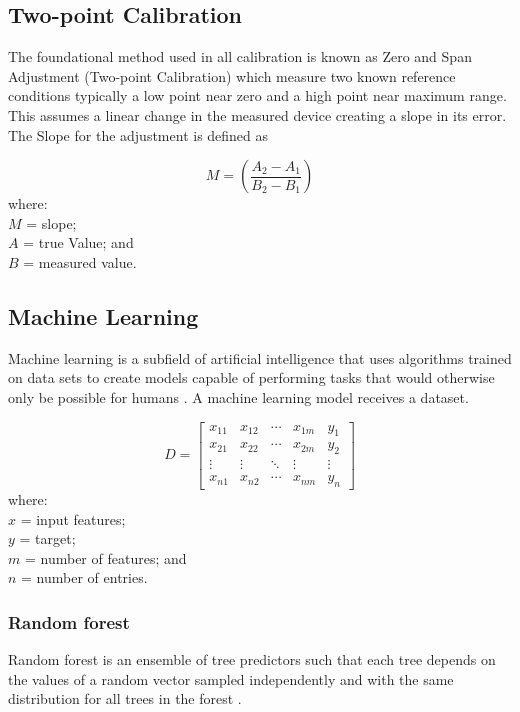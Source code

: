 \subsection{Two-point Calibration}
The foundational method used in all calibration is known as Zero and Span Adjustment (Two-point Calibration) which measure two known reference conditions typically a low point near zero and a high point near maximum range. This assumes a linear change in the measured device creating a slope in its error. The Slope for the adjustment is defined as \cite{Fraden_2016}

\begin{equation}
	M = \left( \frac{A_2 - A_1}{B_2 - B_1} \right)
	\label{eq:slope}
\end{equation}
\noindent where: \\[2pt]
$M$ = slope; \\
$A$ = true Value; and \\
$B$ = measured value. \\

\subsection{Machine Learning}
Machine learning is a subfield of artificial intelligence that uses algorithms trained on data sets to create models capable of performing tasks that would otherwise only be possible for humans \cite{Alzubi_November2018}. A machine learning model receives a dataset.

\begin{equation}
	D = \begin{bmatrix}
		x_{11} & x_{12} & \cdots & x_{1m} & y_1 \\
		x_{21} & x_{22} & \cdots & x_{2m} & y_2 \\
		\vdots & \vdots & \ddots & \vdots & \vdots \\
		x_{n1} & x_{n2} & \cdots & x_{nm} & y_n
	\end{bmatrix}
	\label{eq:dataset}
\end{equation}
\noindent where: \\[2pt]
$x$ = input features; \\
$y$ = target; \\
$m$ = number of features; and \\
$n$ = number of entries. \\

\subsubsection{Random forest} 
Random forest is an ensemble of tree predictors such that each tree depends on the values of a random vector sampled independently and with the same distribution for all trees in the forest \cite{Breiman_2001}. 

